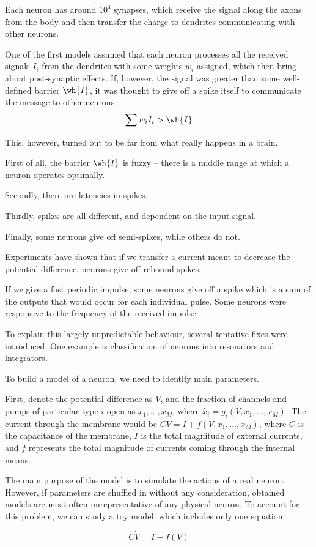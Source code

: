 \documentclass[11pt]{scrartcl}
\begin{document}
  Each neuron has around $10^{4}$ synapses, which receive the signal
  along the axons from the body and then transfer the charge to
  dendrites communicating with other neurons.

  One of the first models assumed that each neuron processes all the
  received signals ${I_{i}}$ from the dendrites with some weights
  ${w_{i}}$ assigned, which then bring about post-synaptic effects.
  If, however, the signal was greater than some well-defined barrier
  $\wh{I}$, it was thought to give off a spike itself to communicate
  the message to other neurons:
  \begin{equation}
    \sum w_{i} I_{i} > \wh{I}
  \end{equation}

  This, however, turned out to be far from what really happens in a
  brain.

  First of all, the barrier $\wh{I}$ is fuzzy -- there is a middle
  range at which a neuron operates optimally.

  Secondly, there are latencies in spikes.

  Thirdly, spikes are all different, and dependent on the input
  signal.

  Finally, some neurons give off semi-spikes, while others do not.

  Experiments have shown that if we transfer a current meant to
  decrease the potential difference, neurons give off rebound spikes.

  If we give a fast periodic impulse, some neurons give off a spike
  which is a sum of the outputs that would occur for each individual
  pulse. Some neurons were responsive to the frequency of the received
  impulse.

  To explain this largely unpredictable behaviour, several tentative
  fixes were introduced. One example is classification of neurons into
  resonators and integrators.

  To build a model of a neuron, we need to identify main parameters.

  First, denote the potential difference as $V$, and the fraction of
  channels and pumps of particular type $i$ open as
  $x_{1}, \dots, x_{M}$, where
  $\dot{x_{i}} = g_{i}(V, x_{1}, \dots, x_{M})$. The current through
  the membrane would be $C\dot{V} = I + f(V, x_{1}, \dots, x_{M})$,
  where $C$ is the capacitance of the membrane, $I$ is the total
  magnitude of external currents, and $f$ represents the total
  magnitude of currents coming through the internal means.

  The main purpose of the model is to simulate the actions of a real
  neuron. However, if parameters are shuffled in without any
  consideration, obtained models are most often unrepresentative of
  any physical neuron. To account for this problem, we can study a toy
  model, which includes only one equation:
  
  \begin{equation*}
    C\dot{V} = I + f(V)
  \end{equation*}

  
\end{document}
